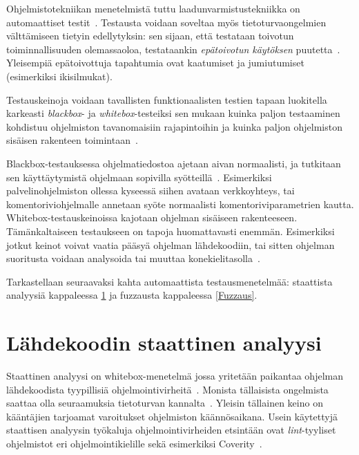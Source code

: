 Ohjelmistotekniikan menetelmistä tuttu laadunvarmistustekniikka on automaattiset testit~\cite[23.1]{Sommerville}.
Testausta voidaan soveltaa myös tietoturvaongelmien välttämiseen tietyin edellytyksin:
sen sijaan, että testataan toivotun toiminnallisuuden olemassaoloa,
testataankin \emph{epätoivotun käytöksen} puutetta~\cite{OuluBrowser}.
Yleisempiä epätoivottuja tapahtumia ovat kaatumiset ja jumiutumiset (esimerkiksi ikisilmukat).


Testauskeinoja voidaan tavallisten funktionaalisten testien tapaan luokitella karkeasti
\emph{blackbox}- ja \emph{whitebox}-testeiksi sen mukaan kuinka paljon
testaaminen kohdistuu ohjelmiston tavanomaisiin rajapintoihin ja kuinka paljon
ohjelmiston sisäisen rakenteen toimintaan~\cite{OuluBrowser}.

Blackbox-testauksessa ohjelmatiedostoa ajetaan aivan normaalisti,
ja tutkitaan sen käyttäytymistä ohjelmaan sopivilla syötteillä~\cite{OuluBrowser}.
Esimerkiksi palvelinohjelmiston ollessa kyseessä siihen avataan verkkoyhteys,
tai komentoriviohjelmalle annetaan syöte normaalisti komentoriviparametrien kautta.
Whitebox-testauskeinoissa kajotaan ohjelman sisäiseen rakenteeseen.
Tä\-män\-kal\-tai\-seen testaukseen on tapoja huomattavasti enemmän.
Esimerkiksi jotkut keinot voivat vaatia pääsyä ohjelman lähdekoodiin,
tai sitten ohjelman suoritusta voidaan analysoida tai muuttaa konekielitasolla~\cite{OuluBrowser}.

Tarkastellaan seuraavaksi kahta automaattista testausmenetelmää: staattista analyysiä
kappaleessa \ref{StaattinenAnalyysi} ja fuzzausta kappaleessa \ref{Fuzzaus}.
\fixme[vanhentunut]

\section{Lähdekoodin staattinen analyysi}
\label{StaattinenAnalyysi}

Staattinen analyysi on whitebox-menetelmä jossa yritetään paikantaa ohjelman
lähdekoodista tyypillisiä ohjelmointivirheitä~\cite[22.3]{Sommerville}.
Monista täl\-lai\-sis\-ta ongelmista saattaa olla seuraamuksia tietoturvan kannalta~\cite{StaticCodeAnalysis}.
Yleisin tällainen keino on kääntäjien tarjoamat varoitukset ohjelmiston käännösaikana.
Usein käytettyjä staattisen analyysin työkaluja ohjelmointivirheiden etsintään
ovat \emph{lint}-tyyliset~\cite{Lint} ohjelmistot eri ohjelmointikielille sekä
esimerkiksi Coverity~\cite{Coverity}.

